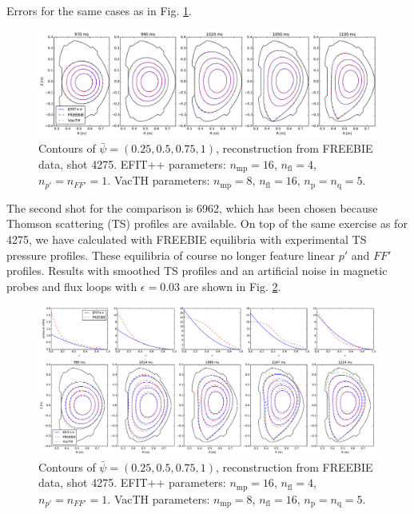 \begin{table}
\caption{Errors for the same cases as in Fig. \ref{fig:ex4275}.}
\label{table:ex4275}
\end{table}

\begin{figure}
\centering   %
\hfill{}
\includegraphics[width=18cm]{figures/example_4275.pdf}
\hfill{}
\caption{Contours of $\bar\psi=\left(0.25,0.5,0.75,1\right)$, reconstruction from FREEBIE data, shot 4275. EFIT++ parameters: $n_\mathrm{mp} = 16$, $n_\mathrm{fl} = 4$, $n_{p'} = n_{FF'} = 1$. VacTH parameters: $n_\mathrm{mp} = 8$, $n_\mathrm{fl} = 16$, $n_{\mathrm p} = n_{\mathrm q} = 5$.}
\label{fig:ex4275}
\end{figure}


The second shot for the comparison is 6962, which has been chosen because Thomson scattering (TS) profiles are available. On top of the same exercise as for 4275, we have calculated with FREEBIE equilibria with experimental TS pressure profiles. These equilibria of course no longer feature linear $p'$ and $FF'$ profiles. Results with smoothed TS profiles and an artificial noise in magnetic probes and flux loops with $\epsilon = 0.03$ are shown in Fig. \ref{fig:ex6962}.

\begin{figure}
\centering   %
\hfill{}
\includegraphics[width=18cm]{figures/example_6962_TS_noise.pdf}
\hfill{}
\caption{Contours of $\bar\psi=\left(0.25,0.5,0.75,1\right)$, reconstruction from FREEBIE data, shot 4275. EFIT++ parameters: $n_\mathrm{mp} = 16$, $n_\mathrm{fl} = 4$, $n_{p'} = n_{FF'} = 1$. VacTH parameters: $n_\mathrm{mp} = 8$, $n_\mathrm{fl} = 16$, $n_{\mathrm p} = n_{\mathrm q} = 5$.}
\label{fig:ex6962}
\end{figure}



